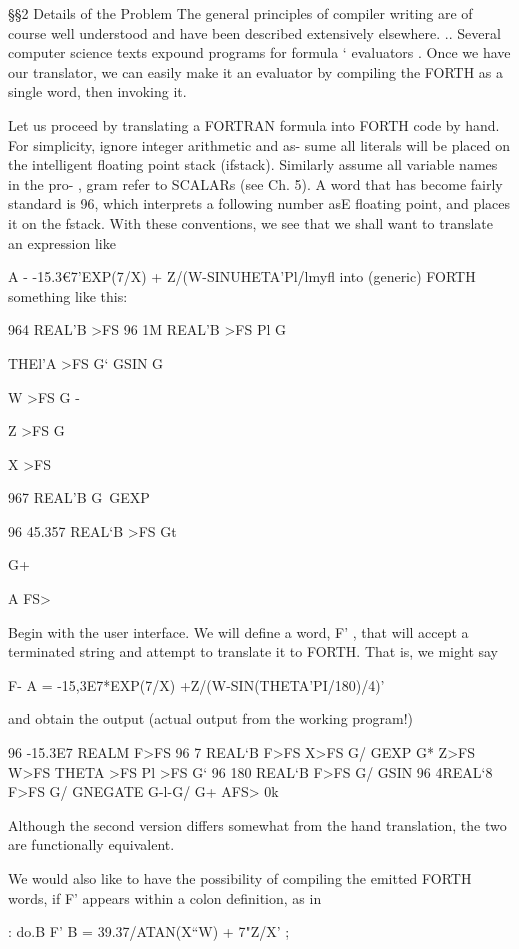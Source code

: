 §§2 Details of the Problem
The general principles of compiler writing are of course well
understood and have been described extensively elsewhere. ..
Several computer science texts expound programs for formula ‘
evaluators . Once we have our translator, we can easily make it
an evaluator by compiling the FORTH as a single word, then
invoking it.

 

Let us proceed by translating a FORTRAN formula into FORTH
code by hand. For simplicity, ignore integer arithmetic and as-
sume all literals will be placed on the intelligent ﬂoating point
stack (ifstack). Similarly assume all variable names in the pro- ,
gram refer to SCALARs (see Ch. 5). A word that has become
fairly standard is 96, which interprets a following number asE
ﬂoating point, and places it on the fstack. With these conventions,
we see that we shall want to translate an expression like

A - -15.3€7'EXP(7/X) + Z/(W-SINUHETA'Pl/lmyﬂ
into (generic) FORTH something like this:

964 REAL’B >FS
96 1M REAL'B >FS
Pl G\

THEl’A >FS G‘
GSIN G

W >FS G -

Z >FS G\

X >FS

967 REAL'B G\
GEXP

96 45.357 REAL‘B >FS
Gt

G+

A FS>

Begin with the user interface. We will define a word, F' , that
will accept a terminated string and attempt to translate it to
FORTH. That is, we might say

F- A = -15,3E7*EXP(7/X) +Z/(W-SIN(THETA'PI/180)/4)'

and obtain the output (actual output from the working program!)

96 -15.3E7 REALM F>FS 96 7 REAL‘B F>FS
X>FS G/ GEXP G* Z>FS W>FS
THETA >FS Pl >FS G‘ 96 180 REAL‘B F>FS
G/ GSIN 96 4REAL‘8 F>FS G/ GNEGATE
G-l-G/ G+ AFS> 0k

Although the second version differs somewhat from the hand
translation, the two are functionally equivalent.

We would also like to have the possibility of compiling the emitted
FORTH words, if F' appears within a colon definition, as in

: do.B F' B = 39.37/ATAN(X“W) + 7"Z/X' ;

